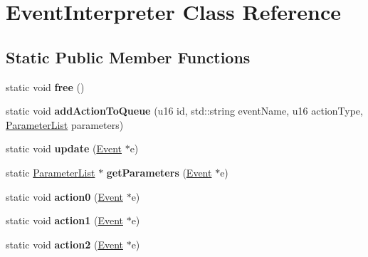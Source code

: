\hypertarget{classEventInterpreter}{\section{Event\-Interpreter Class Reference}
\label{classEventInterpreter}
}
\subsection*{Static Public Member Functions}
\begin{DoxyCompactItemize}
\item 
\hypertarget{classEventInterpreter_ac8a5ac05349eed34424218519a1bbf5c}{static void {\bfseries free} ()}\label{classEventInterpreter_ac8a5ac05349eed34424218519a1bbf5c}

\item 
\hypertarget{classEventInterpreter_a18b1bc95a55713410dc7b3e622d66ff0}{static void {\bfseries add\-Action\-To\-Queue} (u16 id, std\-::string event\-Name, u16 action\-Type, \hyperlink{classParameterList}{Parameter\-List} parameters)}\label{classEventInterpreter_a18b1bc95a55713410dc7b3e622d66ff0}

\item 
\hypertarget{classEventInterpreter_a4b0ea88698556c77d05c92acb95fb54f}{static void {\bfseries update} (\hyperlink{classEvent}{Event} $\ast$e)}\label{classEventInterpreter_a4b0ea88698556c77d05c92acb95fb54f}

\item 
\hypertarget{classEventInterpreter_a413b07b5974e2cae6d153cdc9065b1a9}{static \hyperlink{classParameterList}{Parameter\-List} $\ast$ {\bfseries get\-Parameters} (\hyperlink{classEvent}{Event} $\ast$e)}\label{classEventInterpreter_a413b07b5974e2cae6d153cdc9065b1a9}

\item 
\hypertarget{classEventInterpreter_a81db0b9280b315e3d5efe62cfee6d2af}{static void {\bfseries action0} (\hyperlink{classEvent}{Event} $\ast$e)}\label{classEventInterpreter_a81db0b9280b315e3d5efe62cfee6d2af}

\item 
\hypertarget{classEventInterpreter_adced67617f3cd7521442759ff3b99b3e}{static void {\bfseries action1} (\hyperlink{classEvent}{Event} $\ast$e)}\label{classEventInterpreter_adced67617f3cd7521442759ff3b99b3e}

\item 
\hypertarget{classEventInterpreter_ae734de472b2200e34eea1042c08ec979}{static void {\bfseries action2} (\hyperlink{classEvent}{Event} $\ast$e)}\label{classEventInterpreter_ae734de472b2200e34eea1042c08ec979}

\end{DoxyCompactItemize}
